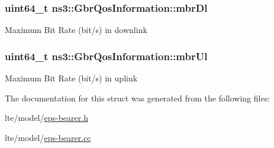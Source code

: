 \subsubsection[{\texorpdfstring{mbr\+Dl}{mbrDl}}]{\setlength{\rightskip}{0pt plus 5cm}uint64\+\_\+t ns3\+::\+Gbr\+Qos\+Information\+::mbr\+Dl}\hypertarget{structns3_1_1GbrQosInformation_ac059dd3ad95475e8df63e52d9c2235e7}{}\label{structns3_1_1GbrQosInformation_ac059dd3ad95475e8df63e52d9c2235e7}
Maximum Bit Rate (bit/s) in downlink 
\subsubsection[{\texorpdfstring{mbr\+Ul}{mbrUl}}]{\setlength{\rightskip}{0pt plus 5cm}uint64\+\_\+t ns3\+::\+Gbr\+Qos\+Information\+::mbr\+Ul}\hypertarget{structns3_1_1GbrQosInformation_afce406e4f92771305075ace6cfe83e36}{}\label{structns3_1_1GbrQosInformation_afce406e4f92771305075ace6cfe83e36}
Maximum Bit Rate (bit/s) in uplink 

The documentation for this struct was generated from the following files\+:\begin{DoxyCompactItemize}
\item 
lte/model/\hyperlink{eps-bearer_8h}{eps-\/bearer.\+h}\item 
lte/model/\hyperlink{eps-bearer_8cc}{eps-\/bearer.\+cc}\end{DoxyCompactItemize}
